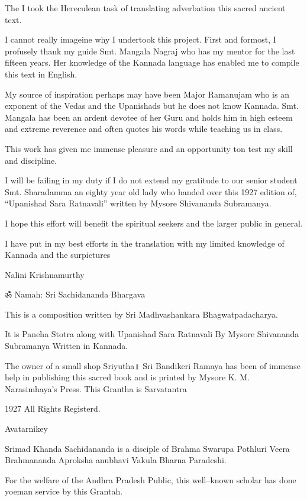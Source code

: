 

The I took the Hereculean task of translating adverbation this sacred ancient text.

I cannot really imageine why I undertook this project. First and formost, I profusely thank my guide Smt. Mangala Nagraj who has my mentor for the last fifteen years. Her knowledge of the Kannada language has enabled me to compile this text in English.

My source of inspiration perhaps may have been Major Ramanujam who is an exponent of the Vedas and the Upanishads but he does not know Kannada. Smt. Mangala has been an ardent devotee of her Guru and holds him in high esteem and extreme reverence and often quotes his words while teaching us in class.

This work has given me immense pleasure and an opportunity ton test my skill and discipline.

I will be failing in my duty if I do not extend my gratitude to our senior student Smt. Sharadamma an eighty year old lady who handed over this 1927 edition of, “Upanishad Sara Ratnavali” written by Mysore Shivananda Subramanya.

I hope this effort will benefit the spiritual seekers and the larger public in general.

I have put in my best efforts in the translation with my limited knowledge of Kannada and the surpictures

Nalini Krishnamurthy



ॐ Namah: Sri Sachidananda Bhargava

This is a composition written by Sri Madhvashankara Bhagwatpadacharya.

It is Paneha Stotra along with Upanishad Sara Ratnavali By Mysore Shivananda Subramanya Written in Kannada.

The owner of a small shop Sriyutha॥ Sri Bandikeri Ramaya has been of immense help in publishing this sacred book and is printed by Mysore K. M. Narasimhaya's Press. This Grantha is Sarvatantra

1927 All Rights Registerd.


Avatarnikey

Srimad Khanda Sachidananda is a disciple of Brahma Swarupa Pothluri Veera Brahmananda Aproksha anubhavi Vakula Bharna Paradeshi.

For the welfare of the Andhra Pradesh Public, this well–known scholar has done yoeman service by this Grantah.

